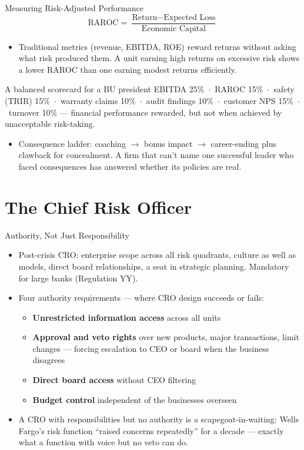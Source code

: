 \documentclass[11pt, aspectratio=169]{beamer}
\begin{document}
\begin{frame}{Measuring Risk-Adjusted Performance}
\[
\text{RAROC} = \frac{\text{Return} - \text{Expected Loss}}{\text{Economic Capital}}
\]
\begin{itemize}
  \item Traditional metrics (revenue, EBITDA, ROE) reward returns without asking what risk produced them. A unit earning high returns on excessive risk shows a \alert{lower} RAROC than one earning modest returns efficiently.
\end{itemize}
\begin{exampleblock}{A balanced scorecard for a BU president}
EBITDA 25\% \,$\cdot$\, RAROC 15\% \,$\cdot$\, safety (TRIR) 15\% \,$\cdot$\, warranty claims 10\% \,$\cdot$\, audit findings 10\% \,$\cdot$\, customer NPS 15\% \,$\cdot$\, turnover 10\% --- financial performance rewarded, but not when achieved by unacceptable risk-taking.
\end{exampleblock}
\begin{itemize}
  \item Consequence ladder: coaching $\rightarrow$ bonus impact $\rightarrow$ career-ending plus clawback for concealment. A firm that can't name one successful leader who faced consequences has answered whether its policies are real.
\end{itemize}
\end{frame}

\section{The Chief Risk Officer}

\begin{frame}{Authority, Not Just Responsibility}
\begin{itemize}
  \item Post-crisis CRO: enterprise scope across all risk quadrants, culture as well as models, direct board relationships, a seat in strategic planning. Mandatory for large banks (Regulation YY).
  \item Four authority requirements --- where CRO design succeeds or fails:
  \begin{itemize}
    \item \textbf{Unrestricted information access} across all units
    \item \textbf{Approval and veto rights} over new products, major transactions, limit changes --- forcing escalation to CEO or board when the business disagrees
    \item \textbf{Direct board access} without CEO filtering
    \item \textbf{Budget control} independent of the businesses overseen
  \end{itemize}
  \item A CRO with responsibilities but no authority is a scapegoat-in-waiting: Wells Fargo's risk function ``raised concerns repeatedly'' for a decade --- \alert{exactly what a function with voice but no veto can do}.
\end{itemize}
\end{frame}
\end{document}
